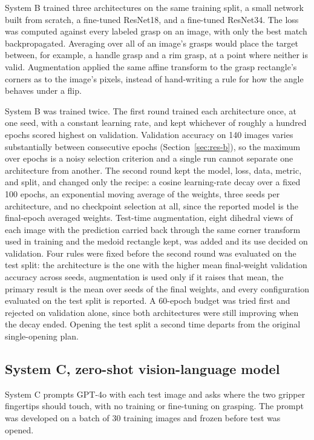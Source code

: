 \documentclass[12pt,letterpaper]{article}
\begin{document}
System B trained three architectures on the same training split, a small
network built from scratch, a fine-tuned ResNet18, and a fine-tuned
ResNet34. The loss was computed against every labeled grasp on an image,
with only the best match backpropagated. Averaging over all of an
image's grasps would place the target between, for example, a handle
grasp and a rim grasp, at a point where neither is valid. Augmentation
applied the same affine transform to the grasp rectangle's corners as to
the image's pixels, instead of hand-writing a rule for how the angle
behaves under a flip.

System B was trained twice. The first round trained each architecture
once, at one seed, with a constant learning rate, and kept whichever of
roughly a hundred epochs scored highest on validation. Validation
accuracy on 140 images varies substantially between consecutive epochs
(Section~\ref{sec:res-b}), so the maximum over epochs is a noisy
selection criterion and a single run cannot separate one architecture
from another. The second round kept the model, loss, data, metric, and
split, and changed only the recipe: a cosine learning-rate decay over a
fixed 100 epochs, an exponential moving average of the weights, three
seeds per architecture, and no checkpoint selection at all, since the
reported model is the final-epoch averaged weights. Test-time
augmentation, eight dihedral views of each image with the prediction
carried back through the same corner transform used in training and the
medoid rectangle kept, was added and its use decided on validation. Four
rules were fixed before the second round was evaluated on the test
split: the architecture is the one with the higher mean final-weight
validation accuracy across seeds, augmentation is used only if it raises
that mean, the primary result is the mean over seeds of the final
weights, and every configuration evaluated on the test split is
reported. A 60-epoch budget was tried first and rejected on validation
alone, since both architectures were still improving when the decay
ended. Opening the test split a second time departs from the original
single-opening plan.

\subsection{System C, zero-shot vision-language model}

System C prompts GPT-4o with each test image and asks where the two
gripper fingertips should touch, with no training or fine-tuning on
grasping. The prompt was developed on a batch of 30 training images and
frozen before test was opened.
\end{document}
